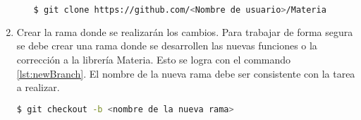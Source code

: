 \begin{enumerate}
\begin{itemize}
\begin{lstlisting}[label={lst:cloneCommand},caption={Commando para clonar el repositorio de GitHub},language=bash]
	$ git clone https://github.com/<Nombre de usuario>/Materia
\end{lstlisting}

			\end{itemize}

		\item Crear la rama donde se realizarán los cambios. Para trabajar de forma segura se debe crear una rama donde se desarrollen las nuevas funciones o la corrección a la librería Materia. Esto se logra con el commando \ref{lst:newBranch}. El nombre de la nueva rama debe ser consistente con la tarea a realizar.
		\begin{lstlisting}[label={lst:newBranch},caption={Commando para crear una nueva rama en el repositorio.},language=bash]
			$ git checkout -b <nombre de la nueva rama>
		\end{lstlisting}
	\end{enumerate}


